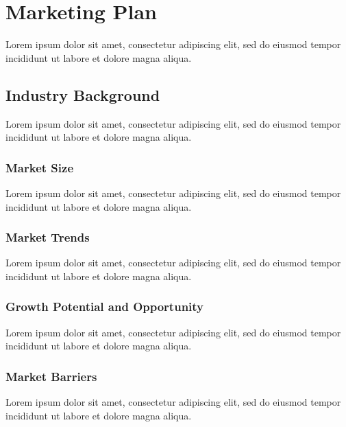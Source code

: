 {\let\cleardoublepage\relax \chapter{Marketing Plan}}


Lorem ipsum dolor sit amet, consectetur adipiscing elit, sed do eiusmod tempor incididunt ut labore et dolore magna aliqua.


\section{Industry Background}

Lorem ipsum dolor sit amet, consectetur adipiscing elit, sed do eiusmod tempor incididunt ut labore et dolore magna aliqua.

\subsection{Market Size}

Lorem ipsum dolor sit amet, consectetur adipiscing elit, sed do eiusmod tempor incididunt ut labore et dolore magna aliqua.

\subsection{Market Trends}

Lorem ipsum dolor sit amet, consectetur adipiscing elit, sed do eiusmod tempor incididunt ut labore et dolore magna aliqua.

\subsection{Growth Potential and Opportunity}

Lorem ipsum dolor sit amet, consectetur adipiscing elit, sed do eiusmod tempor incididunt ut labore et dolore magna aliqua.

\subsection{Market Barriers}

Lorem ipsum dolor sit amet, consectetur adipiscing elit, sed do eiusmod tempor incididunt ut labore et dolore magna aliqua.

